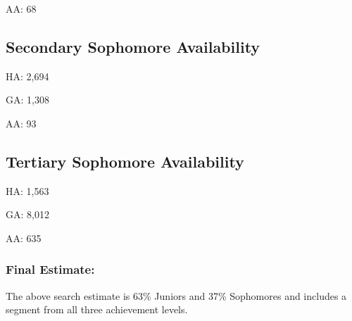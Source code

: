 \documentclass[
]{article}
\begin{document}
AA: 68

\hypertarget{secondary-sophomore-availability}{%
\subsection{Secondary Sophomore
Availability}\label{secondary-sophomore-availability}}

HA: 2,694

GA: 1,308

AA: 93

\hypertarget{tertiary-sophomore-availability}{%
\subsection{Tertiary Sophomore
Availability}\label{tertiary-sophomore-availability}}

HA: 1,563

GA: 8,012

AA: 635

\hypertarget{final-estimate}{%
\subsubsection{Final Estimate:}\label{final-estimate}}

The above search estimate is 63\% Juniors and 37\% Sophomores and
includes a segment from all three achievement levels.
\end{document}
